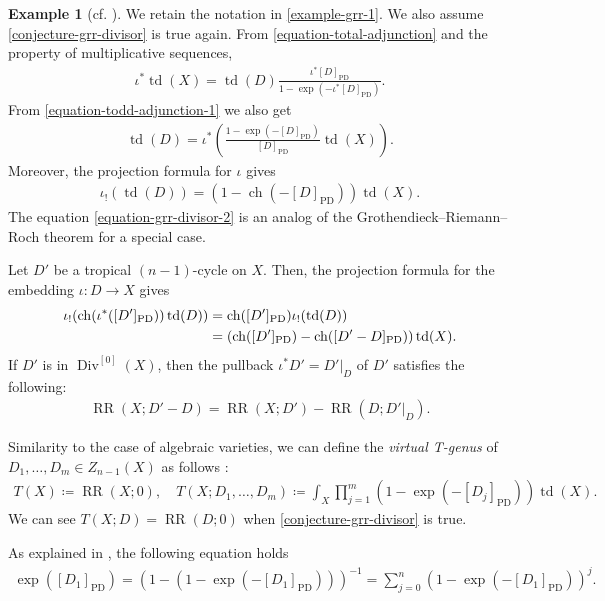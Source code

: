 \documentclass[a4paper,dvipdfmx,reqno,12pt]{amsart}
\theoremstyle{definition}
\newtheorem{example}[theorem]{Example}
\newcommand{\deq}{\coloneqq}
\newcommand{\opn}[1]{\operatorname{#1}}
\newcommand{\PD}[1]{[#1]_{\mathrm{PD}}}
\numberwithin{equation}{section}
\begin{document}
\begin{example}[{cf. \cite[Chapter 13 Appendix]{MR2810322}}]
\label{example-sum-formula}
We retain the notation
in \cref{example-grr-1}.
We also assume \cref{conjecture-grr-divisor} is true again.
From \eqref{equation-total-adjunction}
and the property of multiplicative sequences, 
\begin{align}
\label{equation-todd-adjunction-1}
\iota^{*}\opn{td}(X)=
\opn{td}(D)\frac{\iota^{*}\PD{D}}
{1-\opn{exp}(-\iota^{*}\PD{D})}.
\end{align}
From \cref{equation-todd-adjunction-1} we also get
\begin{align}
\opn{td}(D)
=\iota^{*}\left(
\frac{1-\opn{exp}(-\PD{D})}{
\PD{D}}\opn{td}(X)\right).
\end{align}
Moreover, the projection formula for 
$\iota$ gives
\begin{align}
\label{equation-grr-divisor-2}
\iota_!(\opn{td}(D))=(1-\opn{ch}(-\PD{D}))\opn{td}(X).
\end{align}
The equation \eqref{equation-grr-divisor-2} 
is an analog of 
the Grothendieck--Riemann--Roch theorem
for a special case.

Let $D'$ be a tropical $(n-1)$-cycle on $X$.
Then, the projection formula for 
the embedding $\iota\colon D\to X$ gives
\begin{align}
\iota_!(\opn{ch}(\iota^{*}(\PD{D'}))\opn{td}(D))
&=\opn{ch}(\PD{D'})\iota_!(\opn{td}(D)) \notag \\
&=(\opn{ch}(\PD{D'})-\opn{ch}(\PD{D'-D}))\opn{td}(X).
\end{align}
If $D'$ is in $\opn{Div}^{[0]}(X)$, then
the pullback $\iota^{*}D'=D'|_{D}$ of $D'$ satisfies
the following:
\begin{align}
\label{equation-rr-number-divisor}
\opn{RR}(X;D'-D)=\opn{RR}(X;D')-
\opn{RR}(D;D'|_{D}).
\end{align}


Similarity to the case of algebraic varieties,
we can define the
\emph{virtual T-genus} of $D_1,\ldots,D_m\in Z_{n-1}(X)$
as follows \cite[]{MR1335917}:
\begin{align}
T(X)\deq \opn{RR}(X;0),\quad  T(X;D_1,\ldots,D_m)\deq
\int_X\prod_{j=1}^{m}(1-\opn{exp}(-\PD{D_j}))\opn{td}(X).
\end{align}
We can see $T(X;D)=\opn{RR}(D;0)$ when
\cref{conjecture-grr-divisor} is true.


As explained in \cite[]{MR1335917},
the following equation holds
\begin{align}
\opn{exp}(\PD{D_1})=(1-(1-\opn{exp}(-\PD{D_1})))^{-1}
=\sum_{j=0}^{n}(1-\opn{exp}(-\PD{D_1}))^j.
\end{align}


\end{example}
\end{document}
